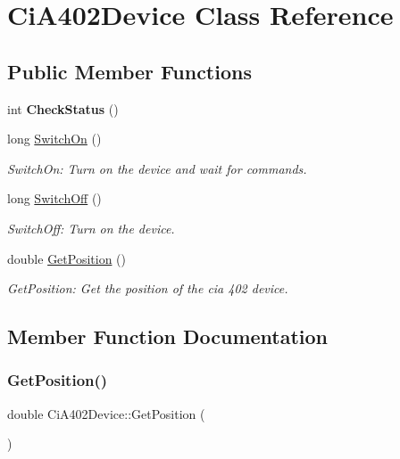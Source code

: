 \hypertarget{classCiA402Device}{}\section{Ci\+A402\+Device Class Reference}
\label{classCiA402Device}
\subsection*{Public Member Functions}
\begin{DoxyCompactItemize}
\item 
\mbox{\label{classCiA402Device_ae71940d1e35a2968a5280bb0f1e5bb5a}} 
int {\bfseries Check\+Status} ()
\item 
long \hyperlink{classCiA402Device_ab77bce0d7f42429f5f8f092aacb02754}{Switch\+On} ()
\begin{DoxyCompactList}\small\item\em Switch\+On\+: Turn on the device and wait for commands. \end{DoxyCompactList}\item 
long \hyperlink{classCiA402Device_a97acf47b3e3751c85fa70091d3bdfa6a}{Switch\+Off} ()
\begin{DoxyCompactList}\small\item\em Switch\+Off\+: Turn on the device. \end{DoxyCompactList}\item 
double \hyperlink{classCiA402Device_ac8d9e36e6f457565cac7d26d91e4a712}{Get\+Position} ()
\begin{DoxyCompactList}\small\item\em Get\+Position\+: Get the position of the cia 402 device. \end{DoxyCompactList}\end{DoxyCompactItemize}


\subsection{Member Function Documentation}
\mbox{\label{classCiA402Device_ac8d9e36e6f457565cac7d26d91e4a712}} 
\subsubsection{\texorpdfstring{Get\+Position()}{GetPosition()}}
{\footnotesize\ttfamily double Ci\+A402\+Device\+::\+Get\+Position (\begin{DoxyParamCaption}{ }\end{DoxyParamCaption})}



